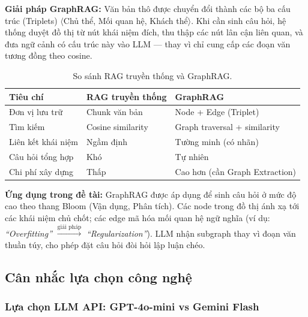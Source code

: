 \textbf{Giải pháp GraphRAG:} Văn bản thô được chuyển đổi thành các bộ ba cấu
trúc (Triplets) $\langle$Chủ thể, Mối quan hệ, Khách thể$\rangle$. Khi cần
sinh câu hỏi, hệ thống duyệt đồ thị từ nút khái niệm đích, thu thập các nút
lân cận liên quan, và đưa ngữ cảnh có cấu trúc này vào LLM --- thay vì chỉ
cung cấp các đoạn văn tương đồng theo cosine.

\begin{table}[H]
    \centering
    \caption{So sánh RAG truyền thống và GraphRAG.}
    \label{tab:rag-vs-graphrag}
    \begin{tabular}{p{4cm}p{5cm}p{5cm}}
        \toprule
        \textbf{Tiêu chí} & \textbf{RAG truyền thống} & \textbf{GraphRAG} \\
        \midrule
        Đơn vị lưu trữ     & Chunk văn bản        & Node + Edge (Triplet) \\
        Tìm kiếm            & Cosine similarity    & Graph traversal + similarity \\
        Liên kết khái niệm  & Ngầm định            & Tường minh (có nhãn) \\
        Câu hỏi tổng hợp    & Khó                  & Tự nhiên \\
        Chi phí xây dựng    & Thấp                 & Cao hơn (cần Graph Extraction) \\
        \bottomrule
    \end{tabular}
\end{table}

\noindent\textbf{Ứng dụng trong đề tài:} GraphRAG được áp dụng để sinh câu
hỏi ở mức độ cao theo thang Bloom (Vận dụng, Phân tích). Các node trong đồ
thị ánh xạ tới các khái niệm chủ chốt; các edge mã hóa mối quan hệ ngữ nghĩa
(ví dụ: \textit{``Overfitting''} $\xrightarrow{\text{giải pháp}}$
\textit{``Regularization''}). LLM nhận subgraph thay vì đoạn văn thuần túy,
cho phép đặt câu hỏi đòi hỏi lập luận chéo.

\subsection{Cân nhắc lựa chọn công nghệ}

\subsubsection{Lựa chọn LLM API: GPT-4o-mini vs Gemini Flash}

